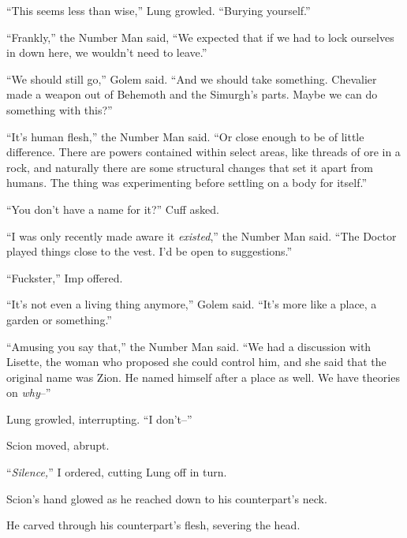 ``This seems less than wise,'' Lung growled.  ``Burying yourself.''



``Frankly,'' the Number Man said, ``We expected that if we had to lock ourselves in down here, we wouldn't need to leave.''



``We should still go,'' Golem said.  ``And we should take something.  Chevalier made a weapon out of Behemoth and the Simurgh's parts.  Maybe we can do something with this?''



``It's human flesh,'' the Number Man said.  ``Or close enough to be of little difference.  There are powers contained within select areas, like threads of ore in a rock, and naturally there are some structural changes that set it apart from humans.  The thing was experimenting before settling on a body for itself.''



``You don't have a name for it?'' Cuff asked.



``I was only recently made aware it \emph{existed},'' the Number Man said.  ``The Doctor played things close to the vest.  I'd be open to suggestions.''



``Fuckster,'' Imp offered.



``It's not even a living thing anymore,'' Golem said.  ``It's more like a place, a garden or something.''



``Amusing you say that,'' the Number Man said.  ``We had a discussion with Lisette, the woman who proposed she could control him, and she said that the original name was Zion.  He named himself after a place as well.  We have theories on \emph{why}--''



Lung growled, interrupting.  ``I don't--''



Scion moved, abrupt.



``\emph{Silence,}'' I ordered, cutting Lung off in turn.



Scion's hand glowed as he reached down to his counterpart's neck.



He carved through his counterpart's flesh, severing the head.



